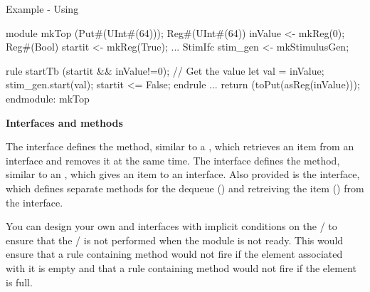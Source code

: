 


Example - Using  

\begin{libverbatim}
module mkTop (Put#(UInt#(64)));
   Reg#(UInt#(64)) inValue <- mkReg(0);
   Reg#(Bool) startit <- mkReg(True);
   ...
   StimIfc     stim_gen <- mkStimulusGen;

   rule startTb (startit && inValue!=0);
      // Get the value
      let val = inValue;
      stim_gen.start(val);
      startit <= False;
   endrule
   ...   
   return (toPut(asReg(inValue)));
endmodule: mkTop
\end{libverbatim}


{\bf Interfaces and methods}

The 
interface defines the  method, similar to a ,
which retrieves an item from an interface and removes it at the same time.  The
 interface defines the  method, similar to an
,  which 
gives an item to an interface.  Also provided is the 
interface, which defines separate methods for the dequeue ()
and retreiving the item () from the interface.  

You can design your own  and  interfaces with  implicit
conditions on the / to 
ensure that the / is not performed when the module is not
ready.  This would ensure that a rule containing  method would not fire
if the element associated with it is empty and that a rule
containing  method would not fire if the element is full.




